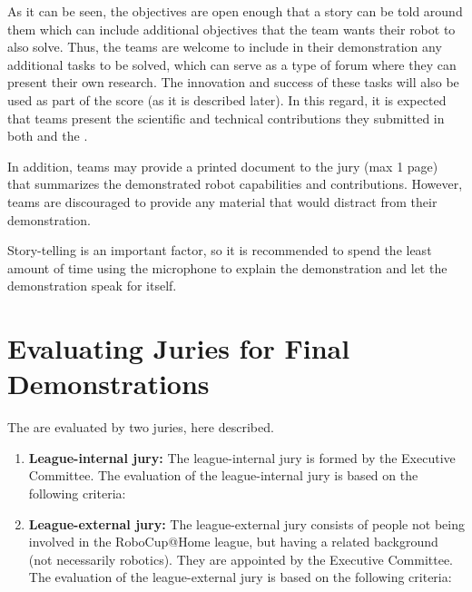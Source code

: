 As it can be seen, the objectives are open enough that a story can be told around them which can include additional objectives that the team wants their robot to also solve. Thus, the teams are welcome to include in their demonstration any additional tasks to be solved, which can serve as a type of forum where they can present their own research. The innovation and success of these tasks will also be used as part of the score (as it is described later). In this regard, it is expected that teams present the scientific and technical contributions they submitted in both  and the .

In addition, teams may provide a printed document to the jury (max 1 page) that summarizes the demonstrated robot capabilities and contributions. However, teams are discouraged to provide any material that would distract from their demonstration.

Story-telling is an important factor, so it is recommended to spend the least amount of time using the microphone to explain the demonstration and let the demonstration speak for itself.


\section{Evaluating Juries for Final Demonstrations}
The  are evaluated by two juries, here described.

\begin{enumerate}
\item\textbf{League-internal jury:} The league-internal jury is formed by the Executive Committee. The evaluation of the league-internal jury is based on the following criteria:

\item \textbf{League-external jury:} The league-external jury consists of people not being involved in the RoboCup@Home league, but having a related background (not necessarily robotics). They are appointed by the Executive Committee. The evaluation of the league-external jury is based on the following criteria:
\end{enumerate}

